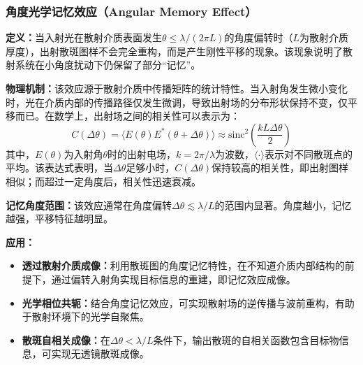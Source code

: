 \subsubsection{角度光学记忆效应（Angular Memory Effect）}

    \textbf{定义：}当入射光在散射介质表面发生$\theta \leq \lambda/(2\pi L)$的角度偏转时（$L$为散射介质厚度），出射散斑图样不会完全重构，而是产生刚性平移的现象。该现象说明了散射系统在小角度扰动下仍保留了部分“记忆”。

    \textbf{物理机制：}该效应源于散射介质中传播矩阵的统计特性。当入射角发生微小变化时，光在介质内部的传播路径仅发生微调，导致出射场的分布形状保持不变，仅平移而已。在数学上，出射场之间的相关性可以表示为：
    \[
    C(\Delta\theta) = \langle E(\theta)E^*(\theta+\Delta\theta) \rangle \approx \text{sinc}^2\left(\frac{kL\Delta\theta}{2}\right)
    \]
    其中，$E(\theta)$为入射角$\theta$时的出射电场，$k = 2\pi/\lambda$为波数，$\langle \cdot \rangle$表示对不同散斑点的平均。该表达式表明，当$\Delta \theta$足够小时，$C(\Delta \theta)$保持较高的相关性，即出射图样相似；而超过一定角度后，相关性迅速衰减。

    \textbf{记忆角度范围：}该效应通常在角度偏转$\Delta \theta \lesssim \lambda / L$的范围内显著。角度越小，记忆越强，平移特征越明显。

    \textbf{应用：}
    \begin{itemize}
        \item \textbf{透过散射介质成像：}利用散斑图的角度记忆特性，在不知道介质内部结构的前提下，通过偏转入射角实现目标信息的重建，即记忆效应成像。
        \item \textbf{光学相位共轭：}结合角度记忆效应，可实现散射场的逆传播与波前重构，有助于散射环境下的光学自聚焦。
        \item \textbf{散斑自相关成像：}在$\Delta\theta < \lambda/L$条件下，输出散斑的自相关函数包含目标物信息，可实现无透镜散斑成像。
    \end{itemize}






